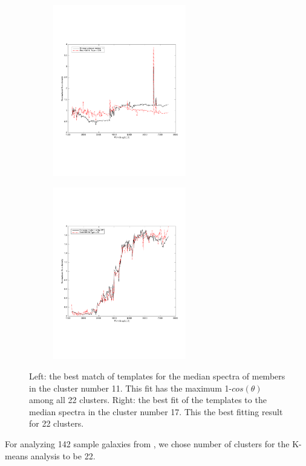 \begin{figure}
                \begin{subfigure}[b]{0.49\textwidth}
                    \centering
                  \includegraphics[width=.99\textwidth, height= 7.5cm]{k_means_images/max_cosine2.pdf}
                \end{subfigure}
                \hfill
                \begin{subfigure}[b]{0.49\textwidth}
                    \centering \includegraphics[width=.99\textwidth, height= 7.5cm]{k_means_images/min_cosine2.pdf}
                \end{subfigure}
                \caption{Left: the best match of  templates for the median spectra of members in the cluster number 11. This fit has the maximum 1-$cos(\theta)$ among all 22 clusters. Right: the best fit of the  templates to the median spectra in the  cluster number 17. This the best fitting result for 22 clusters.}
                 \label{fig: k_means_minmax}
\end{figure}
For analyzing 142 sample galaxies from , we chose number of clusters for the K-means analysis to be 22.
